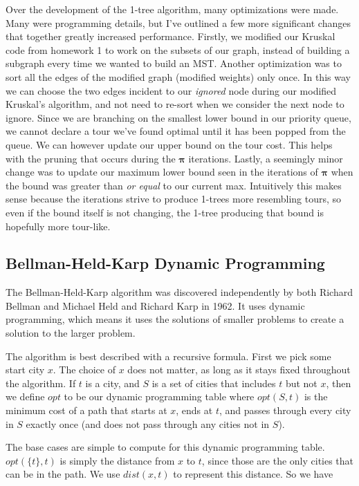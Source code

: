 \documentclass[11pt]{article}
\newcommand{\ve}[1]{\boldsymbol{#1}}
\begin{document}
Over the development of the 1-tree algorithm, many optimizations were made. Many were programming details, but I've outlined a few more significant changes that together greatly increased performance. Firstly, we modified our Kruskal code from homework 1 to work on the subsets of our graph, instead of building a subgraph every time we wanted to build an MST. Another optimization was to sort all the edges of the modified graph (modified weights) only once. In this way we can choose the two edges incident to our \emph{ignored} node during our modified Kruskal's algorithm, and not need to re-sort when we consider the next node to ignore. Since we are branching on the smallest lower bound in our priority queue, we cannot declare a tour we've found optimal until it has been popped from the queue. We can however update our upper bound on the tour cost. This helps with the pruning that occurs during the $\ve{\pi}$ iterations. Lastly, a seemingly minor change was to update our maximum lower bound seen in the iterations of $\ve{\pi}$ when the bound was greater than \emph{or equal} to our current max. Intuitively this makes sense because the iterations strive to produce 1-trees more resembling tours, so even if the bound itself is not changing, the 1-tree producing that bound is hopefully more tour-like.

\subsection{Bellman-Held-Karp Dynamic Programming}

The Bellman-Held-Karp algorithm was discovered independently by both Richard Bellman \cite{Bellman} and Michael Held and Richard Karp \cite{HeldKarp} in 1962. It uses dynamic programming, which means it uses the solutions of smaller problems to create a solution to the larger problem.

The algorithm is best described with a recursive formula. First we pick some start city $x$. The choice of $x$ does not matter, as long as it stays fixed throughout the algorithm. If $t$ is a city, and $S$ is a set of cities that includes $t$ but not $x$, then we define $opt$ to be our dynamic programming table where $opt(S,t)$ is the minimum cost of a path that starts at $x$, ends at $t$, and passes through every city in $S$ exactly once (and does not pass through any cities not in $S$).

The base cases are simple to compute for this dynamic programming table. $opt(\{ t \} , t)$ is simply the distance from $x$ to $t$, since those are the only cities that can be in the path. We use $dist(x,t)$ to represent this distance. So we have
\end{document}
